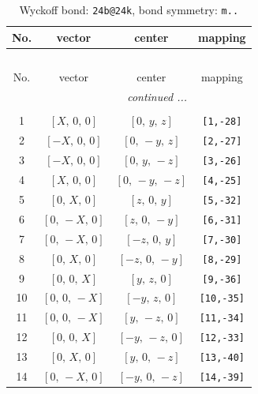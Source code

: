 \documentclass[fleqn,8pt]{jsarticle}
\begin{document}
\begin{longtable}{cccc}
\caption{Wyckoff bond: {\tt 24b@24k}, bond symmetry: {\tt m..}}
 \\
 \hline \hline
No. & vector & center & mapping \\ \hline \endfirsthead

\multicolumn{3}{l}{\tablename\ \thetable{}} \\
 \hline \hline
No. & vector & center & mapping \\ \hline \endhead

 \hline \hline
\multicolumn{3}{r}{\footnotesize\it continued ...} \\ \endfoot

 \hline \hline
\multicolumn{3}{r}{} \\ \endlastfoot

1 & $\left[ X,\, 0,\, 0 \right]$ & $\left[ 0,\, y,\, z \right]$ & {\tt [1,-28]} \\ \hline
2 & $\left[ - X,\, 0,\, 0 \right]$ & $\left[ 0,\, - y,\, z \right]$ & {\tt [2,-27]} \\ \hline
3 & $\left[ - X,\, 0,\, 0 \right]$ & $\left[ 0,\, y,\, - z \right]$ & {\tt [3,-26]} \\ \hline
4 & $\left[ X,\, 0,\, 0 \right]$ & $\left[ 0,\, - y,\, - z \right]$ & {\tt [4,-25]} \\ \hline
5 & $\left[ 0,\, X,\, 0 \right]$ & $\left[ z,\, 0,\, y \right]$ & {\tt [5,-32]} \\ \hline
6 & $\left[ 0,\, - X,\, 0 \right]$ & $\left[ z,\, 0,\, - y \right]$ & {\tt [6,-31]} \\ \hline
7 & $\left[ 0,\, - X,\, 0 \right]$ & $\left[ - z,\, 0,\, y \right]$ & {\tt [7,-30]} \\ \hline
8 & $\left[ 0,\, X,\, 0 \right]$ & $\left[ - z,\, 0,\, - y \right]$ & {\tt [8,-29]} \\ \hline
9 & $\left[ 0,\, 0,\, X \right]$ & $\left[ y,\, z,\, 0 \right]$ & {\tt [9,-36]} \\ \hline
10 & $\left[ 0,\, 0,\, - X \right]$ & $\left[ - y,\, z,\, 0 \right]$ & {\tt [10,-35]} \\ \hline
11 & $\left[ 0,\, 0,\, - X \right]$ & $\left[ y,\, - z,\, 0 \right]$ & {\tt [11,-34]} \\ \hline
12 & $\left[ 0,\, 0,\, X \right]$ & $\left[ - y,\, - z,\, 0 \right]$ & {\tt [12,-33]} \\ \hline
13 & $\left[ 0,\, X,\, 0 \right]$ & $\left[ y,\, 0,\, - z \right]$ & {\tt [13,-40]} \\ \hline
14 & $\left[ 0,\, - X,\, 0 \right]$ & $\left[ - y,\, 0,\, - z \right]$ & {\tt [14,-39]} \\ \hline

\end{longtable}
\end{document}
